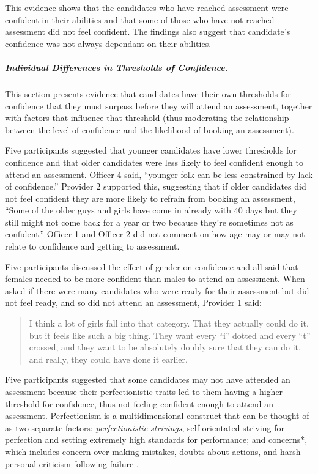 \documentclass[
  12pt,
  a4paper,
]{book}
\begin{document}
This evidence shows that the candidates who have reached assessment were confident in their abilities and that some of those who have not reached assessment did not feel confident. The findings also suggest that candidate's confidence was not always dependant on their abilities.

\hypertarget{study1-ind-diff-conf}{%
\subparagraph{Individual Differences in Thresholds of Confidence.}\label{study1-ind-diff-conf}}

This section presents evidence that candidates have their own thresholds for confidence that they must surpass before they will attend an assessment, together with factors that influence that threshold (thus moderating the relationship between the level of confidence and the likelihood of booking an assessment).

Five participants suggested that younger candidates have lower thresholds for confidence and that older candidates were less likely to feel confident enough to attend an assessment. Officer 4 said, ``younger folk can be less constrained by lack of confidence.'' Provider 2 supported this, suggesting that if older candidates did not feel confident they are more likely to refrain from booking an assessment, ``Some of the older guys and girls have come in already with 40 days but they still might not come back for a year or two because they're sometimes not as confident.'' Officer 1 and Officer 2 did not comment on how age may or may not relate to confidence and getting to assessment.

Five participants discussed the effect of gender on confidence and all said that females needed to be more confident than males to attend an assessment. When asked if there were many candidates who were ready for their assessment but did not feel ready, and so did not attend an assessment, Provider 1 said:

\begin{quote}
I think a lot of girls fall into that category. That they actually could do it, but it feels like such a big thing. They want every ``i'' dotted and every ``t'' crossed, and they want to be absolutely doubly sure that they can do it, and really, they could have done it earlier.
\end{quote}

Five participants suggested that some candidates may not have attended an assessment because their perfectionistic traits led to them having a higher threshold for confidence, thus not feeling confident enough to attend an assessment. Perfectionism is a multidimensional construct that can be thought of as two separate factors: \emph{perfectionistic strivings}, self-orientated striving for perfection and setting extremely high standards for performance; and concerns*, which includes concern over making mistakes, doubts about actions, and harsh personal criticism following failure \citep[cf.~][]{Stoeber2006, Stoeber2017}.
\end{document}
